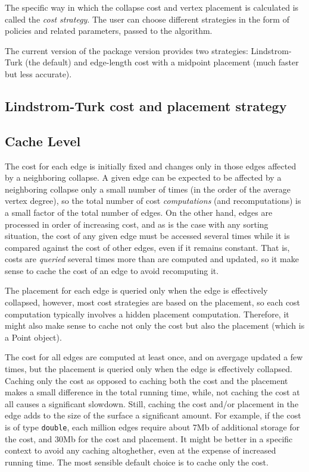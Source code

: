 The specific way in which the collapse cost and vertex placement is
calculated is called the {\em cost strategy}. The user can choose 
different strategies in the form of policies and related parameters,
passed to the algorithm.
 
The current version of the package version provides two strategies: 
Lindstrom-Turk (the default) and edge-length cost with a midpoint placement 
(much faster but less accurate).

\subsection{Lindstrom-Turk cost and placement strategy\label{SurfaceMeshSimplification:LindstromTurkStrategy}}

\subsection{Cache Level}

The cost for each edge is initially fixed and changes only in those edges 
affected by a neighboring collapse. A given edge can be expected to be 
affected by a neighboring collapse only a small number of times 
(in the order of the average vertex degree), so the total number of 
cost {\em computations} (and recomputations) is a small factor of
the total number of edges. 
On the other hand, edges are processed in order of increasing cost, and as is 
the case with any sorting situation, the cost of any given edge must be accessed 
several times while it is compared against the cost of other edges, even if it 
remains constant. That is, costs are {\em queried} several times more than are computed 
and updated, so it make sense to cache the cost of an edge to avoid recomputing it.

The placement for each edge is queried only when the edge is effectively collapsed, 
however, most cost strategies are based on the placement, so each cost computation 
typically involves a hidden placement computation. Therefore, it might also make sense
to cache not only the cost but also the placement (which is a Point object).

The cost for all edges are computed at least once, and on avergage updated a few times,
but the placement is queried only when the edge is effectively collapsed. Caching only
the cost as opposed to caching both the cost and the placement makes a small difference
in the total running time, while, not caching the cost at all causes a significant slowdown.
Still, caching the cost and/or placement in the edge adds to the size of the surface 
a significant amount. For example, if the cost is of type {\tt double}, each million edges
require about 7Mb of additional storage for the cost, and 30Mb for the cost and placement.
It might be better in a specific context to avoid any caching altoghether, even 
at the expense of increased running time. The most sensible default choice is to cache
only the cost.

